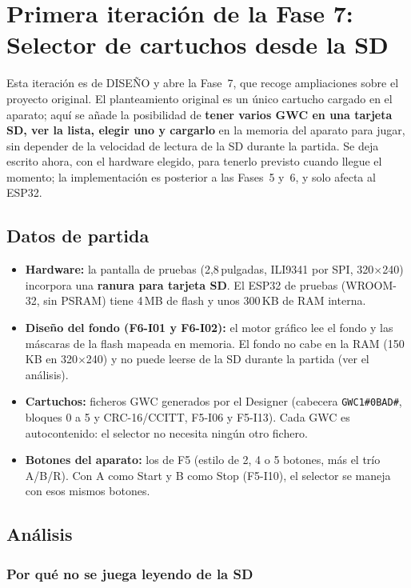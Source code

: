 \section{Primera iteración de la Fase 7: Selector de cartuchos desde la SD}
\label{sec:F7I01}

Esta iteración es de DISEÑO y abre la Fase~7, que recoge ampliaciones sobre el proyecto original. El planteamiento original es un único cartucho cargado en el aparato; aquí se añade la posibilidad de \textbf{tener varios GWC en una tarjeta SD, ver la lista, elegir uno y cargarlo} en la memoria del aparato para jugar, sin depender de la velocidad de lectura de la SD durante la partida. Se deja escrito ahora, con el hardware elegido, para tenerlo previsto cuando llegue el momento; la implementación es posterior a las Fases~5 y~6, y solo afecta al ESP32.

\subsection{Datos de partida}
\label{sec:F7I01Datos}

\begin{itemize}
	\item \textbf{Hardware:} la pantalla de pruebas (2,8\,pulgadas, ILI9341 por SPI, 320$\times$240) incorpora una \textbf{ranura para tarjeta SD}. El ESP32 de pruebas (WROOM-32, sin PSRAM) tiene 4\,MB de flash y unos 300\,KB de RAM interna.
	\item \textbf{Diseño del fondo (F6-I01 y F6-I02):} el motor gráfico lee el fondo y las máscaras de la flash mapeada en memoria. El fondo no cabe en la RAM (150\,KB en 320$\times$240) y no puede leerse de la SD durante la partida (ver el análisis).
	\item \textbf{Cartuchos:} ficheros GWC generados por el Designer (cabecera \texttt{GWC1\#0BAD\#}, bloques 0 a 5 y CRC-16/CCITT, F5-I06 y F5-I13). Cada GWC es autocontenido: el selector no necesita ningún otro fichero.
	\item \textbf{Botones del aparato:} los de F5 (estilo de 2, 4 o 5 botones, más el trío A/B/R). Con A como Start y B como Stop (F5-I10), el selector se maneja con esos mismos botones.
\end{itemize}

\subsection{Análisis}
\label{sec:F7I01Analisis}

\subsubsection{Por qué no se juega leyendo de la SD}

